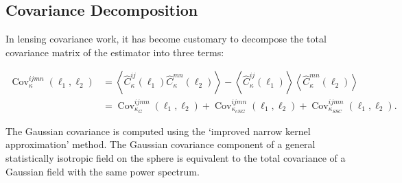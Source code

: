 \subsection{Covariance Decomposition}

In lensing covariance work, it has become customary to decompose the total covariance matrix of the estimator into three terms:

\begin{align}
    \label{eq:cov}
    \operatorname{Cov}_\kappa^{ijmn}(\ell_1, \ell_2) &= \left\langle\hat{C}_\kappa^{ij}(\ell_1) \hat{C}_\kappa^{mn}(\ell_2)\right\rangle - \left\langle\hat{C}_\kappa^{ij}(\ell_1)\right\rangle\left\langle\hat{C}_\kappa^{mn}(\ell_2)\right\rangle \\
    \nonumber &= \operatorname{Cov}_{\kappa_G}^{ijmn}(\ell_1, \ell_2) + \operatorname{Cov}_{\kappa_{cNG}}^{ijmn}(\ell_1, \ell_2) + \operatorname{Cov}_{\kappa_{SSC}}^{ijmn}(\ell_1, \ell_2).
\end{align}

The Gaussian covariance is computed using the `improved narrow kernel approximation' method. The Gaussian covariance component of a general statistically isotropic field on the sphere is equivalent to the total covariance of a Gaussian field with the same power spectrum. 